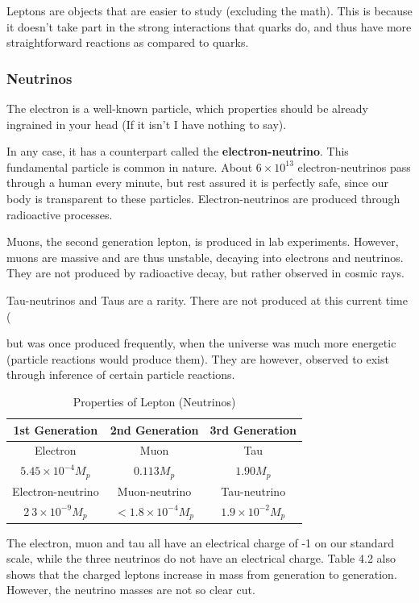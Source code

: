 Leptons are objects that are easier to study (excluding the math). This is because it doesn't take part in the strong interactions that quarks do, and thus have more straightforward reactions as compared to quarks.

\subsubsection{Neutrinos}
The electron is a well-known particle, which properties should be already ingrained in your head (If it isn't I have nothing to say).

In any case, it has a counterpart called the \textbf{electron-neutrino}. This fundamental particle is common in nature. About $6\times10^{13}$ electron-neutrinos pass through a human every minute, but rest assured it is perfectly safe, since our body is transparent to these particles. Electron-neutrinos are produced through radioactive processes.

Muons, the second generation lepton, is produced in lab experiments. However, muons are massive and are thus unstable, decaying into electrons and neutrinos. They are not produced by radioactive decay, but rather observed in cosmic rays.

Tau-neutrinos and Taus are a rarity. There are not produced at this current time (\date) but was once produced frequently, when the universe was much more energetic (particle reactions would produce them). They are however, observed to exist through inference of certain particle reactions.

\begin{table}[http]
\begin{center}
\begin{tabular}{|c|c|c|}
\hline
1st Generation & 2nd Generation & 3rd Generation \\
\hline
Electron & Muon & Tau\\
$5.45\times10^{-4}M_p$ & $0.113 M_p$ & $1.90M_p$\\
\hline
Electron-neutrino & Muon-neutrino & Tau-neutrino\\
$2~3 \times 10^{-9} M_p$ & $<1.8\times 10^{-4}M_p$ & $1.9\times10^{-2}M_p$\\ \hline
\end{tabular}
\end{center}
\label{Neutrinos}
\caption{Properties of Lepton (Neutrinos)}
\end{table}%

The electron, muon and tau all have an electrical charge of -1 on our standard scale, while the three neutrinos do not have an electrical charge. Table 4.2 also shows that the charged leptons increase in mass from generation to generation. However, the neutrino masses are not so clear cut.

